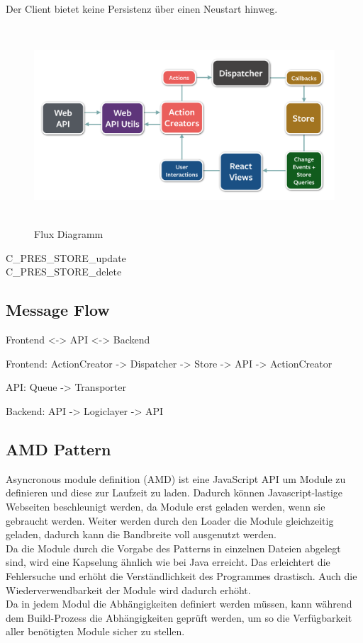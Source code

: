 \documentclass[oneside,11pt,parskip=half,ngerman]{scrreprt}
\makeatletter
\def\maxwidth{\ifdim\Gin@nat@width>\linewidth\linewidth
\else\Gin@nat@width\fi}
\let\Oldincludegraphics\includegraphics
\renewcommand{\includegraphics}[1]{\Oldincludegraphics[width=\maxwidth,height=20em,keepaspectratio]{#1}}
\makeatother
\begin{document}
Der Client bietet keine Persistenz über einen Neustart hinweg.

\begin{figure}[htbp]
\centering
\includegraphics{img/flux-diagram.png}
\caption{Flux Diagramm}
\end{figure}

C\_PRES\_STORE\_update\\C\_PRES\_STORE\_delete

\subsection{Message Flow}\label{message-flow}

Frontend \textless{}-\textgreater{} API \textless{}-\textgreater{}
Backend

Frontend: ActionCreator -\textgreater{} Dispatcher -\textgreater{} Store
-\textgreater{} API -\textgreater{} ActionCreator

API: Queue -\textgreater{} Transporter

Backend: API -\textgreater{} Logiclayer -\textgreater{} API

\subsection{AMD Pattern}\label{amd-pattern}

Asyncronous module definition (AMD) ist eine JavaScript API um Module zu
definieren und diese zur Laufzeit zu laden. Dadurch können
Javascript-lastige Webseiten beschleunigt werden, da Module erst geladen
werden, wenn sie gebraucht werden. Weiter werden durch den Loader die
Module gleichzeitig geladen, dadurch kann die Bandbreite voll ausgenutzt
werden.\\Da die Module durch die Vorgabe des Patterns in einzelnen
Dateien abgelegt sind, wird eine Kapselung ähnlich wie bei Java
erreicht. Das erleichtert die Fehlersuche und erhöht die
Verständlichkeit des Programmes drastisch. Auch die Wiederverwendbarkeit
der Module wird dadurch erhöht.\\Da in jedem Modul die Abhängigkeiten
definiert werden müssen, kann während dem Build-Prozess die
Abhängigkeiten geprüft werden, um so die Verfügbarkeit aller benötigten
Module sicher zu stellen.
\end{document}

